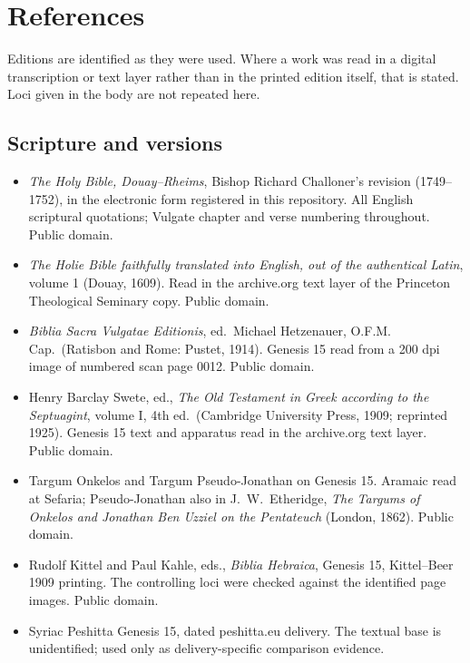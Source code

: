 \section{References}

Editions are identified as they were used. Where a work was read in a digital
transcription or text layer rather than in the printed edition itself, that is
stated. Loci given in the body are not repeated here.

\subsection{Scripture and versions}

\begin{itemize}[leftmargin=1.2em,itemsep=0.2em,topsep=0.3em]
\item \textit{The Holy Bible, Douay--Rheims}, Bishop Richard Challoner's revision
(1749--1752), in the electronic form registered in this repository. All English
scriptural quotations; Vulgate chapter and verse numbering throughout. Public
domain.
\item \textit{The Holie Bible faithfully translated into English, out of the
authentical Latin}, volume 1 (Douay, 1609). Read in the archive.org text layer of
the Princeton Theological Seminary copy. Public domain.
\item \textit{Biblia Sacra Vulgatae Editionis}, ed.\ Michael Hetzenauer, O.F.M.
Cap.\ (Ratisbon and Rome: Pustet, 1914). Genesis 15 read from a 200 dpi image of
numbered scan page 0012. Public domain.
\item Henry Barclay Swete, ed., \textit{The Old Testament in Greek according to
the Septuagint}, volume I, 4th ed.\ (Cambridge University Press, 1909; reprinted
1925). Genesis 15 text and apparatus read in the archive.org text layer. Public
domain.
\item Targum Onkelos and Targum Pseudo-Jonathan on Genesis 15. Aramaic read at
Sefaria; Pseudo-Jonathan also in J.~W.~Etheridge, \textit{The Targums of Onkelos
and Jonathan Ben Uzziel on the Pentateuch} (London, 1862). Public domain.
\item Rudolf Kittel and Paul Kahle, eds., \textit{Biblia Hebraica}, Genesis 15,
Kittel--Beer 1909 printing. The controlling loci were checked against the
identified page images. Public domain.
\item Syriac Peshitta Genesis 15, dated peshitta.eu delivery. The textual base
is unidentified; used only as delivery-specific comparison evidence.
\end{itemize}

